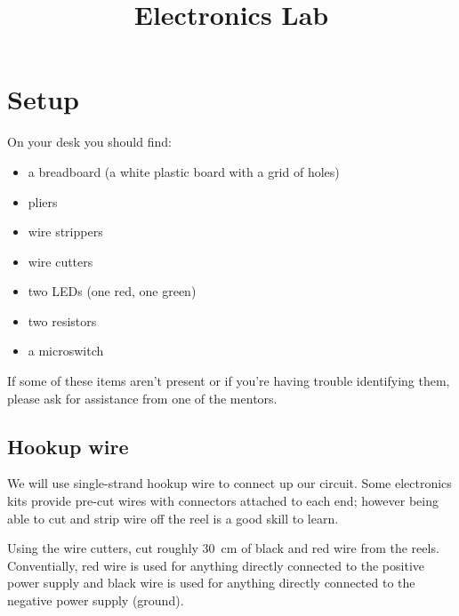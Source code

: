 \documentclass{article}
\title{Electronics Lab}
\begin{document}
\listoftodos
\newpage

\maketitle


\section{Setup}

On your desk you should find:

\begin{itemize}
\item a breadboard (a white plastic board with a grid of holes)
\item pliers
\item wire strippers
\item wire cutters
\item two LEDs (one red, one green)
\item two resistors
\item a microswitch
\end{itemize}


If some of these items aren't present or if you're having trouble identifying
them, please ask for assistance from one of the mentors.

\subsection{Hookup wire}

We will use single-strand hookup wire to connect up our circuit. Some
electronics kits provide pre-cut wires with connectors attached to each end;
however being able to cut and strip wire off the reel is a good skill to learn.

Using the wire cutters, cut roughly \SI{30}{\centi\metre} of black and red wire
from the reels. Conventially, red wire is used for anything directly connected
to the positive power supply and black wire is used for anything directly
connected to the negative power supply (ground).
\end{document}
